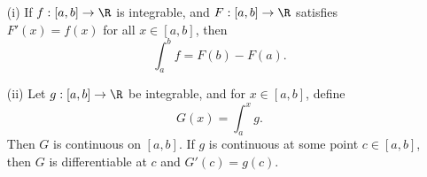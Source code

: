 \begin{tcolorbox}
	\begin{thm}
	\begin{enumerate}
		\item[(i)] If \( f: [a,b] \to \R  \) is integrable, and \( F : [a,b] \to \R  \) satisfies \( F'(x) = f(x)  \) for all \( x \in [a,b]  \), then 
			\[  \int_{ a }^{ b } f = F(b) - F(a). \]
		\item[(ii)] Let \( g: [a,b] \to \R  \) be integrable, and for \( x \in [a,b]  \), define 
			\[  G(x) = \int_{ a }^{ x } g. \]
			Then \( G  \) is continuous on \( [a,b]  \). If \( g  \) is continuous at some point \( c \in [a,b]  \), then \( G  \) is differentiable at \( c  \) and \( G'(c) = g(c)  \).
	\end{enumerate}
	\end{thm}
\end{tcolorbox}

